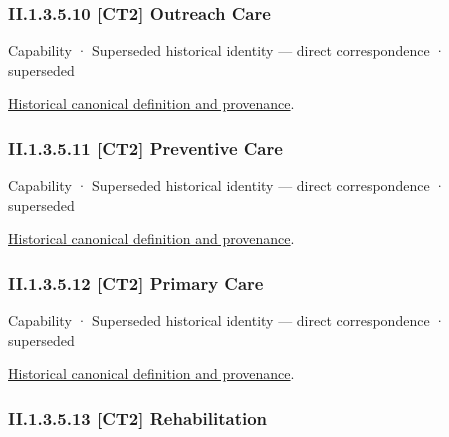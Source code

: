 \subsubsection*{II.1.3.5.10 [CT2] Outreach Care}
\label{navigation:II.1.3.5.10}

\label{element:75f8b32a3d5048ccbdfb30d61ae73dad}
{\small Capability · Superseded historical identity — direct correspondence · superseded}\par
\href{../../../../continuum/strategy/capability/75f8b32a3d5048ccbdfb30d61ae73dad.md}{Historical canonical definition and provenance}.\par
\subsubsection*{II.1.3.5.11 [CT2] Preventive Care}
\label{navigation:II.1.3.5.11}

\label{element:97f0d1acc37b4ca994c6c1ca006f2daa}
{\small Capability · Superseded historical identity — direct correspondence · superseded}\par
\href{../../../../continuum/strategy/capability/97f0d1acc37b4ca994c6c1ca006f2daa.md}{Historical canonical definition and provenance}.\par
\subsubsection*{II.1.3.5.12 [CT2] Primary Care}
\label{navigation:II.1.3.5.12}

\label{element:fe9d58b5cfe14e8cb7a83a1ac6686d65}
{\small Capability · Superseded historical identity — direct correspondence · superseded}\par
\href{../../../../continuum/strategy/capability/fe9d58b5cfe14e8cb7a83a1ac6686d65.md}{Historical canonical definition and provenance}.\par
\subsubsection*{II.1.3.5.13 [CT2] Rehabilitation}
\label{navigation:II.1.3.5.13}

